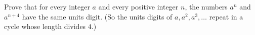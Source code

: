Prove that for every integer $a$ and every positive integer $n$, the numbers $a^n$ and $a^{n+4}$ have the same units digit. (So the units digits of $a,a^2,a^3,\dots$ repeat in a cycle whose length divides $4$.)
